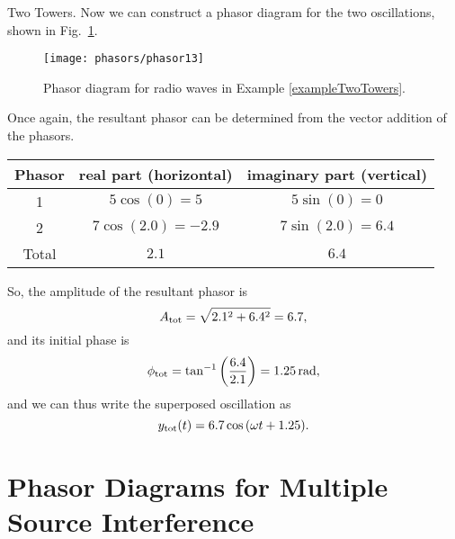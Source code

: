 \begin{exampleb}{Two Towers.}
Now we can construct a phasor diagram for the two oscillations, shown
in Fig.~\ref{fig:phasor13}.

\begin{figure}\begin{center}
 \texttt{[image: phasors/phasor13]} 
\caption{\label{fig:phasor13}Phasor diagram for radio waves in 
Example \ref{exampleTwoTowers}.}
\end{center}
\end{figure}

Once again, the resultant phasor can be determined from the vector
addition of the phasors.

\renewcommand{\arraystretch}{2.0}
\begin{center}
\begin{tabular}{|c|c|c|}\hline
\quad Phasor\quad\mbox{} &
\quad real part (horizontal) \quad \mbox{}&
\quad imaginary part (vertical) \quad\mbox{} \\ 
\hline\hline
1      & $5\cos{\left(0\right)}=5$ & $5\sin{\left(0\right)}=0$ \\
\hline
2      & $7\cos{\left(2.0\right)}=-2.9$ & $7\sin{\left(2.0\right)}=6.4$ \\
\hline\hline
Total  & $2.1$   & $6.4$ \\
\hline
\end{tabular}
\end{center}
\renewcommand{\arraystretch}{1.0}
\vspace{0.08in}

So, the amplitude of the resultant phasor is 
\begin{equation}
A_{\rm tot} = \sqrt{2.1^2 + 6.4^2} = 6.7,
\end{equation}
and its initial phase is
\begin{equation}
\phi_{\rm tot} = \tan^{-1}{\left(\frac{6.4}{2.1}\right)} 
      = 1.25\,\mbox{rad},
\end{equation} 
and we can thus write the superposed oscillation as
\begin{equation}
y_{\rm tot}(t) = 6.7\cos{(\omega t + 1.25)}. 
\end{equation}
\end{exampleb}

\section[Multi-Source Interference]{Phasor Diagrams for Multiple Source Interference}
\label{sec:phasors_multiple_source}

